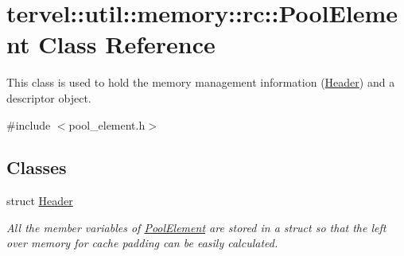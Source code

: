 \hypertarget{classtervel_1_1util_1_1memory_1_1rc_1_1_pool_element}{}\section{tervel\+:\+:util\+:\+:memory\+:\+:rc\+:\+:Pool\+Element Class Reference}
\label{classtervel_1_1util_1_1memory_1_1rc_1_1_pool_element}


This class is used to hold the memory management information (\hyperlink{structtervel_1_1util_1_1memory_1_1rc_1_1_pool_element_1_1_header}{Header}) and a descriptor object.  




{\ttfamily \#include $<$pool\+\_\+element.\+h$>$}

\subsection*{Classes}
\begin{DoxyCompactItemize}
\item 
struct \hyperlink{structtervel_1_1util_1_1memory_1_1rc_1_1_pool_element_1_1_header}{Header}
\begin{DoxyCompactList}\small\item\em All the member variables of \hyperlink{classtervel_1_1util_1_1memory_1_1rc_1_1_pool_element}{Pool\+Element} are stored in a struct so that the left over memory for cache padding can be easily calculated. \end{DoxyCompactList}\end{DoxyCompactItemize}

